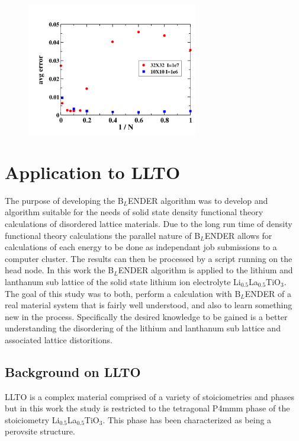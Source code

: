 \documentclass[aps,prl,reprint,superscriptaddress,showkeys]{revtex4-1}
\begin{document}
\begin{figure}
\includegraphics[width=7.5cm]{./figures/randN_3232_1010_S100.png}\\
\caption{\label{N_dependence}}
\end{figure}

\section{Application to LLTO}
The purpose of developing the B$_L$ENDER algorithm was to develop and algorithm suitable for the needs of solid state density functional theory calculations of disordered lattice materials.  Due to the long run time of density functional theory calculations  the parallel nature of B$_L$ENDER allows for calculations of each energy to be done as independant job submissions to a computer cluster. The results can then be processed by a script running on the head node.  In this work the B$_L$ENDER algorithm is applied to the lithium and lanthanum sub lattice of the solid state lithium ion electrolyte  Li$_{0.5}$La$_{0.5}$TiO$_{3}$. The goal of this study was to both, perform a calculation with B$_L$ENDER of a real material system that is fairly well understood, and also to learn something new in the process.  Specifically the desired knowledge to be gained is a better understanding the disordering of the lithium and lanthanum sub lattice and associated lattice distoritions. 

\subsection{Background on LLTO}
LLTO is a complex material comprised of a variety of stoiciometries and phases but in this work the study is restricted to the tetragonal P4mmm phase of the stoiciometry Li$_{0.5}$La$_{0.5}$TiO$_{3}$. This phase has been characterized as being a perovsite structure.  
\end{document}
